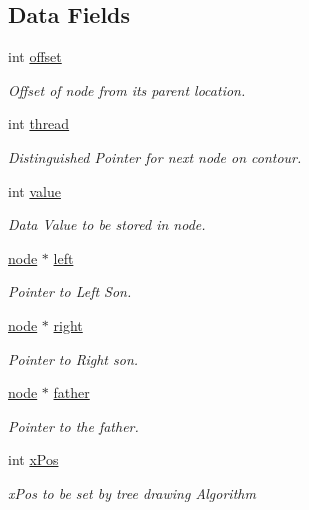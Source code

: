 \subsection*{Data Fields}
\begin{DoxyCompactItemize}
\item 
int \hyperlink{structnodes_aed7ea92f45bd273dde380a45ddced592}{offset}
\begin{DoxyCompactList}\small\item\em Offset of node from it\textquotesingle{}s parent location. \end{DoxyCompactList}\item 
int \hyperlink{structnodes_a9b61df5d32336fad4da524d04a01b329}{thread}
\begin{DoxyCompactList}\small\item\em Distinguished Pointer for next node on contour. \end{DoxyCompactList}\item 
int \hyperlink{structnodes_ac4f474c82e82cbb89ca7c36dd52be0ed}{value}
\begin{DoxyCompactList}\small\item\em Data Value to be stored in node. \end{DoxyCompactList}\item 
\hyperlink{binary_tree_w_s_8h_aafd781b4673cf2585cd9a156aebd08de}{node} $\ast$ \hyperlink{structnodes_a1ef696d612a6d91ca233f86051a17560}{left}
\begin{DoxyCompactList}\small\item\em Pointer to Left Son. \end{DoxyCompactList}\item 
\hyperlink{binary_tree_w_s_8h_aafd781b4673cf2585cd9a156aebd08de}{node} $\ast$ \hyperlink{structnodes_ae274df3c21d52825564b9811fa84f71b}{right}
\begin{DoxyCompactList}\small\item\em Pointer to Right son. \end{DoxyCompactList}\item 
\hyperlink{binary_tree_w_s_8h_aafd781b4673cf2585cd9a156aebd08de}{node} $\ast$ \hyperlink{structnodes_ad584b58b1159012e8a83c77d0365453a}{father}
\begin{DoxyCompactList}\small\item\em Pointer to the father. \end{DoxyCompactList}\item 
int \hyperlink{structnodes_a6806e78862b165988ca9b855e230084e}{x\+Pos}
\begin{DoxyCompactList}\small\item\em x\+Pos to be set by tree drawing Algorithm \end{DoxyCompactList}\item 

\end{DoxyCompactItemize}
